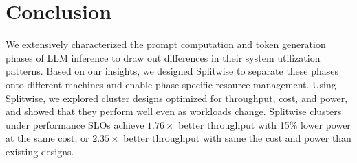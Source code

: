 \section{Conclusion}
\label{sec:conclusion}

We extensively characterized the prompt computation and token generation phases of LLM inference to draw out differences in their system utilization patterns.
Based on our insights, we designed Splitwise to separate these phases onto different machines and enable phase-specific resource management.
Using Splitwise, we explored cluster designs optimized for throughput, cost, and power, and showed that they perform well even as workloads change.
Splitwise clusters under performance SLOs achieve $1.76\times$ better throughput with 15\% lower power at the same cost, or $2.35\times$ better throughput with same the cost and power than existing designs.
